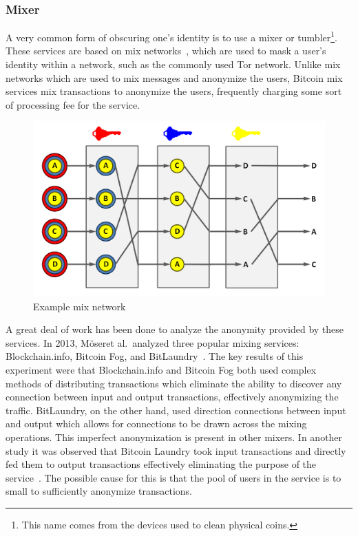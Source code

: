 \documentclass[11pt]{article}
\newcommand{\Moser}{M{\"o}ser}
\begin{document}
\subsubsection{Mixer}
A very common form of obscuring one's identity is to use a mixer or
tumbler\footnote{This name comes from the devices used to clean physical coins.}.
These services are based on mix networks~\cite{chaum81}, which are used to mask
a user's identity within a network, such as the commonly used Tor network.
Unlike mix networks which are used to mix messages and anonymize the
users, Bitcoin mix services mix transactions to anonymize the users, frequently
charging some sort of processing fee for the service.

\begin{figure}[H]
    \caption[Example mix network]{Example mix network\protect\footnotemark}
    \centering
    \includegraphics[width=.8\linewidth]{figures/mix.png}
\end{figure}


A great deal of work has been done to analyze the anonymity provided by these services.
In 2013, \Moser et al.\ analyzed three popular mixing services: Blockchain.info,
Bitcoin Fog, and BitLaundry~\cite{moser13}. The key results of this experiment
were that Blockchain.info and Bitcoin Fog both used complex methods of
distributing transactions which eliminate the ability to discover any connection
between input and output transactions, effectively anonymizing the traffic.
BitLaundry, on the other hand, used direction connections between input and
output which allows for connections to be drawn across the mixing operations.
This imperfect anonymization is present in other mixers. In another study it
was observed that Bitcoin Laundry took input transactions and directly fed them
to output transactions effectively eliminating the purpose of the
service~\cite{meiklejohn13}. The possible cause for this is that the pool of
users in the service is to small to sufficiently anonymize transactions.
\end{document}
